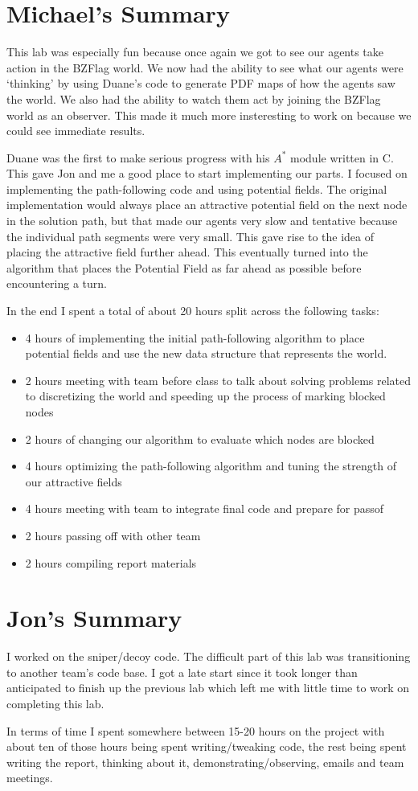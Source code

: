 \section{Michael's Summary}
This lab was especially fun because once again we got to see our agents take action in the BZFlag world.  We now had the ability to see what our agents were `thinking' by using Duane's code to generate PDF maps of how the agents saw the world.  We also had the ability to watch them act by joining the BZFlag world as an observer.  This made it much more insteresting to work on because we could see immediate results.
\par
Duane was the first to make serious progress with his $A^*$ module written in C.  This gave Jon and me a good place to start implementing our parts.  I focused on implementing the path-following code and using potential fields.  The original implementation would always place an attractive potential field on the next node in the solution path, but that made our agents very slow and tentative because the individual path segments were very small. This gave rise to the idea of placing the attractive field further ahead.  This eventually turned into the algorithm that places the Potential Field as far ahead as possible before encountering a turn.
\par
In the end I spent a total of about 20 hours split across the following tasks:
\begin{itemize}
    \item 4 hours of implementing the initial path-following algorithm to place potential fields and use the new data structure that represents the world.
    \item 2 hours meeting with team before class to talk about solving problems related to discretizing the world and speeding up the process of marking blocked nodes
    \item 2 hours of changing our algorithm to evaluate which nodes are blocked
    \item 4 hours optimizing the path-following algorithm and tuning the strength of our attractive fields
    \item 4 hours meeting with team to integrate final code and prepare for passof
    \item 2 hours passing off with other team
    \item 2 hours compiling report materials
\end{itemize}

\section{Jon's Summary}

I worked on the sniper/decoy code.  The difficult part of this lab was transitioning to another team's code base.  I got a late start since it took  longer than anticipated to finish up the previous lab which left me with little time to work on completing this lab.

In terms of time I spent somewhere between 15-20 hours on the project with about ten of those hours being spent writing/tweaking code, the rest being spent writing the report, thinking about it, demonstrating/observing, emails and team meetings.


